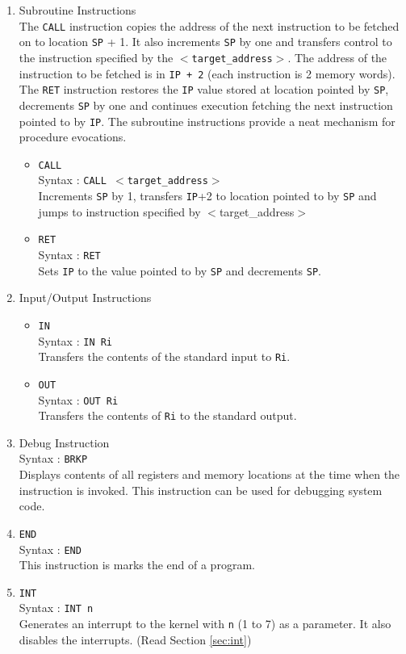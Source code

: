 \documentclass[11pt]{report}
\begin{document}
\begin{enumerate}
\item Subroutine Instructions\\
The \texttt{CALL} instruction copies the address of the next instruction to be fetched on to location \texttt{SP} + 1. It also increments \texttt{SP} by one and transfers control to the instruction specified by the \texttt{$<$target\_address$>$}. The address of the instruction to be fetched is in \texttt{IP + 2} (each instruction is 2 memory words). The \texttt{RET} instruction restores the \texttt{IP} value stored at location pointed by \texttt{SP}, decrements \texttt{SP} by one and continues execution fetching the next instruction pointed to by \texttt{IP}. The subroutine instructions provide a neat mechanism for procedure evocations.
\begin{itemize}
\item \texttt{CALL}\\
Syntax : \texttt{CALL $<$target\_address$>$}\\
Increments \texttt{SP} by 1, transfers \texttt{IP}+2 to location pointed to by \texttt{SP} and jumps to instruction specified by $<$target\_address$>$
\item \texttt{RET}\\
Syntax : \texttt{RET}\\
Sets \texttt{IP} to the value pointed to by \texttt{SP} and decrements \texttt{SP}.
\end{itemize}

\item Input/Output Instructions
\begin{itemize}
\item \texttt{IN}\\
Syntax : \texttt{IN Ri}\\
Transfers the contents of the standard input to \texttt{Ri}.
\item \texttt{OUT}\\
Syntax : \texttt{OUT Ri}\\
Transfers the contents of \texttt{Ri} to the standard output.\\
\end{itemize}


\item Debug Instruction\\
Syntax : \texttt{BRKP}\\
Displays contents of all registers and memory locations at the time when the instruction is invoked. This instruction can be used for debugging system code.


\item \texttt{END}\\
Syntax : \texttt{END}\\
This instruction is marks the end of a program.

\item \texttt{INT}\\
Syntax : \texttt{INT n}\\
Generates an interrupt to the kernel with \texttt{n} (1 to 7) as a parameter. It also disables the interrupts. (Read Section \ref{sec:int})



\end{enumerate}
\end{document}
